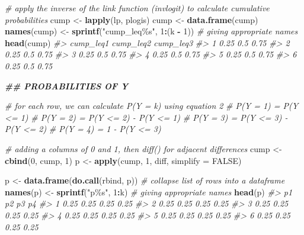 \documentclass[
  man, mask,floatsintext]{apa6}
\newenvironment{Shaded}{\begin{snugshade}}{\end{snugshade}}
\newcommand{\AttributeTok}[1]{\textcolor[rgb]{0.13,0.29,0.53}{#1}}
\newcommand{\CommentTok}[1]{\textcolor[rgb]{0.56,0.35,0.01}{\textit{#1}}}
\newcommand{\ConstantTok}[1]{\textcolor[rgb]{0.56,0.35,0.01}{#1}}
\newcommand{\DecValTok}[1]{\textcolor[rgb]{0.00,0.00,0.81}{#1}}
\newcommand{\DocumentationTok}[1]{\textcolor[rgb]{0.56,0.35,0.01}{\textbf{\textit{#1}}}}
\newcommand{\FunctionTok}[1]{\textcolor[rgb]{0.13,0.29,0.53}{\textbf{#1}}}
\newcommand{\NormalTok}[1]{#1}
\newcommand{\OtherTok}[1]{\textcolor[rgb]{0.56,0.35,0.01}{#1}}
\newcommand{\SpecialCharTok}[1]{\textcolor[rgb]{0.81,0.36,0.00}{\textbf{#1}}}
\newcommand{\StringTok}[1]{\textcolor[rgb]{0.31,0.60,0.02}{#1}}
\begin{document}
\begin{Shaded}
\begin{Highlighting}[]
\CommentTok{\# apply the inverse of the link function (invlogit) to calculate cumulative probabilities}
\NormalTok{cump }\OtherTok{\textless{}{-}} \FunctionTok{lapply}\NormalTok{(lp, plogis)}
\NormalTok{cump }\OtherTok{\textless{}{-}} \FunctionTok{data.frame}\NormalTok{(cump)}
\FunctionTok{names}\NormalTok{(cump) }\OtherTok{\textless{}{-}} \FunctionTok{sprintf}\NormalTok{(}\StringTok{"cump\_leq\%s"}\NormalTok{, }\DecValTok{1}\SpecialCharTok{:}\NormalTok{(k }\SpecialCharTok{{-}} \DecValTok{1}\NormalTok{)) }\CommentTok{\# giving appropriate names}
\FunctionTok{head}\NormalTok{(cump)}
\CommentTok{\#\textgreater{}   cump\_leq1 cump\_leq2 cump\_leq3}
\CommentTok{\#\textgreater{} 1      0.25       0.5      0.75}
\CommentTok{\#\textgreater{} 2      0.25       0.5      0.75}
\CommentTok{\#\textgreater{} 3      0.25       0.5      0.75}
\CommentTok{\#\textgreater{} 4      0.25       0.5      0.75}
\CommentTok{\#\textgreater{} 5      0.25       0.5      0.75}
\CommentTok{\#\textgreater{} 6      0.25       0.5      0.75}

\DocumentationTok{\#\# PROBABILITIES OF Y}

\CommentTok{\# for each row, we can calculate P(Y = k) using equation 2}
\CommentTok{\# P(Y = 1) = P(Y \textless{}= 1)}
\CommentTok{\# P(Y = 2) = P(Y \textless{}= 2) {-} P(Y \textless{}= 1)}
\CommentTok{\# P(Y = 3) = P(Y \textless{}= 3) {-} P(Y \textless{}= 2)}
\CommentTok{\# P(Y = 4) = 1 {-} P(Y \textless{}= 3)}

\CommentTok{\# adding a columns of 0 and 1, then diff() for adjacent differences}
\NormalTok{cump }\OtherTok{\textless{}{-}} \FunctionTok{cbind}\NormalTok{(}\DecValTok{0}\NormalTok{, cump, }\DecValTok{1}\NormalTok{)}
\NormalTok{p }\OtherTok{\textless{}{-}} \FunctionTok{apply}\NormalTok{(cump, }\DecValTok{1}\NormalTok{, diff, }\AttributeTok{simplify =} \ConstantTok{FALSE}\NormalTok{)}

\NormalTok{p }\OtherTok{\textless{}{-}} \FunctionTok{data.frame}\NormalTok{(}\FunctionTok{do.call}\NormalTok{(rbind, p)) }\CommentTok{\# collapse list of rows into a dataframe}
\FunctionTok{names}\NormalTok{(p) }\OtherTok{\textless{}{-}} \FunctionTok{sprintf}\NormalTok{(}\StringTok{"p\%s"}\NormalTok{, }\DecValTok{1}\SpecialCharTok{:}\NormalTok{k) }\CommentTok{\# giving appropriate names}
\FunctionTok{head}\NormalTok{(p)}
\CommentTok{\#\textgreater{}     p1   p2   p3   p4}
\CommentTok{\#\textgreater{} 1 0.25 0.25 0.25 0.25}
\CommentTok{\#\textgreater{} 2 0.25 0.25 0.25 0.25}
\CommentTok{\#\textgreater{} 3 0.25 0.25 0.25 0.25}
\CommentTok{\#\textgreater{} 4 0.25 0.25 0.25 0.25}
\CommentTok{\#\textgreater{} 5 0.25 0.25 0.25 0.25}
\CommentTok{\#\textgreater{} 6 0.25 0.25 0.25 0.25}


\end{Highlighting}
\end{Shaded}
\end{document}
